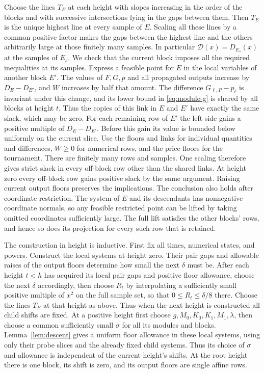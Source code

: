 Choose the lines $T_E$ at each height with slopes increasing in the
order of the blocks and with successive intersections lying in the
gaps between them. Then $T_E$ is the unique highest line at every
sample of $E$. Scaling all these lines by a common positive factor
makes the gaps between the highest line and the others arbitrarily
large at those finitely many samples. In particular
$\mathcal D(x)=D_{E_s}(x)$ at the samples of $E_s$.
We check that the current block imposes all the required inequalities
at its samples. Express a feasible point for $E$ in the local variables of
another block $E'$. The values of $F,G,p$ and all propagated outputs
increase by $D_E-D_{E'}$, and $W$ increases by half that amount.
The difference $G_{\ell,P}-p_\ell$ is invariant under this change,
and its lower bound in \eqref{eq:module-g} is shared by all blocks at
height $t$. Thus the copies of this link in $E$ and $E'$ have exactly
the same slack, which may be zero. For each remaining row of $E'$
the left side gains a positive multiple of $D_E-D_{E'}$. Before this
gain its value is bounded below uniformly on the current slice.
Use the floors and links for individual quantities and differences,
$W\ge0$ for numerical rows, and the price floors for the tournament.
There are finitely many rows and samples. One scaling therefore gives
strict slack in every off-block row other than the shared links.
At height zero every off-block row gains positive slack by the same
argument. Raising current output floors preserves the implications. The conclusion also holds after coordinate restriction. The system of
\(E\) and its descendants has nonnegative coordinate normals, so any
feasible restricted point can be lifted by taking omitted coordinates
sufficiently large. The full lift satisfies the other blocks' rows,
and hence so does its projection for every such row that is retained.

The construction in height is inductive. First fix all times,
numerical states, and powers. Construct the local systems at height
zero. Their pair gaps and allowable raises of the output floors
determine how small the next $\delta$ must be. After each height
$t<h$ has acquired its local pair gaps and positive floor allowance,
choose the next $\delta$ accordingly, then choose $R_t$ by interpolating
a sufficiently small positive multiple of $x^2$ on the full sample
set, so that $0\le R_t\le\delta/8$ there. Choose the lines $T_E$ at
that height as above. Thus when the next height is constructed all
child shifts are fixed. At a positive height first choose
$g,M_0,K_0,K_1,M_1,\lambda$, then choose a common sufficiently small
$\sigma$ for all its modules and blocks. Lemma~\ref{lem:descent}
gives a uniform floor allowance in these local systems, using only
their probe slices and the already fixed child systems. Thus its
choice of $\sigma$ and allowance is independent of the current
height's shifts. At the root height there is one
block, its shift is zero, and its output floors are single affine rows.
